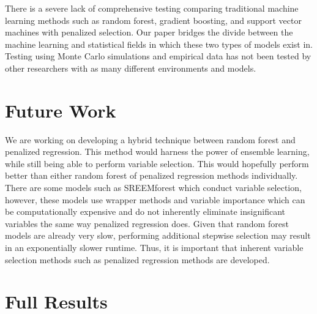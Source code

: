 \documentclass{article}
\begin{document}
There is a severe lack of comprehensive testing comparing traditional machine learning methods such as random forest, gradient boosting, and support vector machines with penalized selection. Our paper bridges the divide between the machine learning and statistical fields in which these two types of models exist in. Testing using Monte Carlo simulations and empirical data has not been tested by other researchers with as many different environments and models. 
\section{Future Work}
We are working on developing a hybrid technique between random forest and penalized regression. This method would harness the power of ensemble learning, while still being able to perform variable selection. This would hopefully perform better than either random forest of penalized regression methods individually. There are some models such as SREEMforest \cite{capitaine2021random} which conduct variable selection, however, these models use wrapper methods and variable importance which can be computationally expensive and do not inherently eliminate insignificant variables the same way penalized regression does. Given that random forest models are already very slow, performing additional stepwise selection may result in an exponentially slower runtime. Thus, it is important that inherent variable selection methods such as penalized regression methods are developed.

\newpage
\appendix
\section{Full Results}
\label{app:full-results}

\setlength{\tabcolsep}{3pt}

{\tiny
\begin{landscape}
	\centering
	\captionsetup{width = 6in}
	\label{tab:train-mse-1000-10}
	
	
	\newpage
	
	\label{tab:test-mse-1000-10}
	
	
	\newpage
	
	\label{tab:train-mse-50-2000}
	
	
	\bigskip
	
	\label{tab:test-mse-50-2000}
	
\end{landscape}
}
\setlength{\tabcolsep}{6pt}


\newpage


\end{document}
